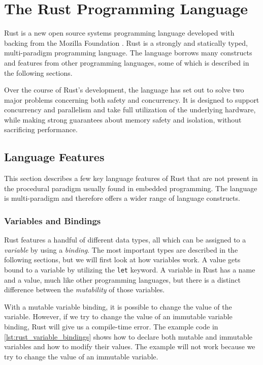 
\section{The Rust Programming Language} %
\label{sub:the_rust_programming_language}

Rust \cite{web:rust_lang} is a new open source systems programming language developed with backing from the Mozilla Foundation \cite{web:mozilla_foundation}.
Rust is a strongly and statically typed, multi-paradigm programming language.
The language borrows many constructs and features from other programming languages, some of which is described in the following sections.

Over the course of Rust's development, the language has set out to solve two major problems concerning both safety and concurrency.
It is designed to support concurrency and parallelism and take full utilization of the underlying hardware, while making strong guarantees about memory safety and isolation, without sacrificing performance.

\subsection{Language Features}
\label{ssub:rust:features}

This section describes a few key language features of Rust that are not present in the procedural paradigm usually found in embedded programming.
The language is multi-paradigm and therefore offers a wider range of language constructs.

\subsubsection{Variables and Bindings}

Rust features a handful of different data types, all which can be assigned to a \emph{variable} by using a \emph{binding}.
The most important types are described in the following sections, but we will first look at how variables work.
A value gets bound to a variable by utilizing the \texttt{let} keyword.
A variable in Rust has a name and a value, much like other programming languages, but there is a distinct difference between the \emph{mutability} of those variables.

With a mutable variable binding, it is possible to change the value of the variable.
However, if we try to change the value of an immutable variable binding, Rust will give us a compile-time error.
The example code in \autoref{lst:rust_variable_bindings} shows how to declare both mutable and immutable variables and how to modify their values.
The example will not work because we try to change the value of an immutable variable.

